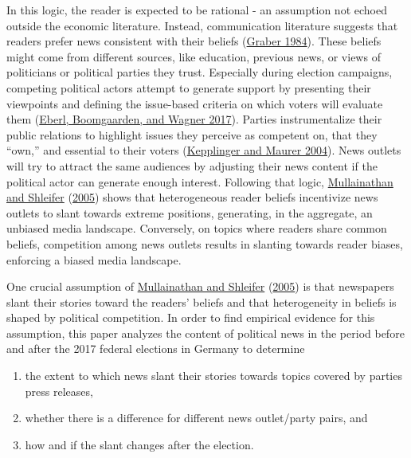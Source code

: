 \documentclass[
  12pt,
]{article}
\providecommand{\tightlist}{%
  \setlength{\itemsep}{0pt}\setlength{\parskip}{0pt}}
\begin{document}
In this logic, the reader is expected to be rational - an assumption not
echoed outside the economic literature. Instead, communication
literature suggests that readers prefer news consistent with their
beliefs (\protect\hyperlink{ref-graber_processing_1984}{Graber 1984}).
These beliefs might come from different sources, like education,
previous news, or views of politicians or political parties they trust.
Especially during election campaigns, competing political actors attempt
to generate support by presenting their viewpoints and defining the
issue-based criteria on which voters will evaluate them
(\protect\hyperlink{ref-eberl_one_2017}{Eberl, Boomgaarden, and Wagner
2017}). Parties instrumentalize their public relations to highlight
issues they perceive as competent on, that they ``own,'' and essential
to their voters
(\protect\hyperlink{ref-kepplinger_einfluss_2004}{Kepplinger and Maurer
2004}). News outlets will try to attract the same audiences by adjusting
their news content if the political actor can generate enough interest.
Following that logic,
\protect\hyperlink{ref-mullainathan_market_2005}{Mullainathan and
Shleifer} (\protect\hyperlink{ref-mullainathan_market_2005}{2005}) shows
that heterogeneous reader beliefs incentivize news outlets to slant
towards extreme positions, generating, in the aggregate, an unbiased
media landscape. Conversely, on topics where readers share common
beliefs, competition among news outlets results in slanting towards
reader biases, enforcing a biased media landscape.

One crucial assumption of
\protect\hyperlink{ref-mullainathan_market_2005}{Mullainathan and
Shleifer} (\protect\hyperlink{ref-mullainathan_market_2005}{2005}) is
that newspapers slant their stories toward the readers' beliefs and that
heterogeneity in beliefs is shaped by political competition. In order to
find empirical evidence for this assumption, this paper analyzes the
content of political news in the period before and after the 2017
federal elections in Germany to determine

\begin{enumerate}
\def\labelenumi{\alph{enumi})}
\tightlist
\item
  the extent to which news slant their stories towards topics covered by
  parties press releases,
\item
  whether there is a difference for different news outlet/party pairs,
  and
\item
  how and if the slant changes after the election.
\end{enumerate}
\end{document}
